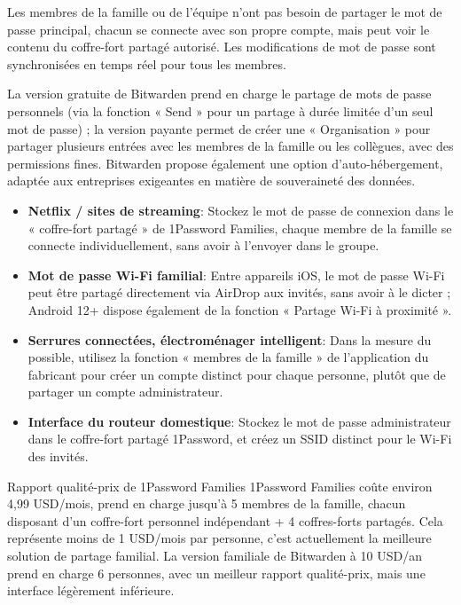 Les membres de la famille ou de l'équipe n'ont pas besoin de partager le mot de passe principal, chacun se connecte avec son propre compte, mais peut voir le contenu du coffre-fort partagé autorisé. Les modifications de mot de passe sont synchronisées en temps réel pour tous les membres.


La version gratuite de Bitwarden prend en charge le partage de mots de passe personnels (via la fonction « Send » pour un partage à durée limitée d'un seul mot de passe) ; la version payante permet de créer une « Organisation » pour partager plusieurs entrées avec les membres de la famille ou les collègues, avec des permissions fines. Bitwarden propose également une option d'auto-hébergement, adaptée aux entreprises exigeantes en matière de souveraineté des données.


\begin{itemize}
  \item \textbf{Netflix / sites de streaming}: Stockez le mot de passe de connexion dans le « coffre-fort partagé » de 1Password Families, chaque membre de la famille se connecte individuellement, sans avoir à l'envoyer dans le groupe.
  \item \textbf{Mot de passe Wi-Fi familial}: Entre appareils iOS, le mot de passe Wi-Fi peut être partagé directement via AirDrop aux invités, sans avoir à le dicter ; Android 12+ dispose également de la fonction « Partage Wi-Fi à proximité ».
  \item \textbf{Serrures connectées, électroménager intelligent}: Dans la mesure du possible, utilisez la fonction « membres de la famille » de l'application du fabricant pour créer un compte distinct pour chaque personne, plutôt que de partager un compte administrateur.
  \item \textbf{Interface du routeur domestique}: Stockez le mot de passe administrateur dans le coffre-fort partagé 1Password, et créez un SSID distinct pour le Wi-Fi des invités.
\end{itemize}

\begin{tcbinfo}{Rapport qualité-prix de 1Password Families}
1Password Families coûte environ 4,99 USD/mois, prend en charge jusqu'à 5 membres de la famille, chacun disposant d'un coffre-fort personnel indépendant + 4 coffres-forts partagés. Cela représente moins de 1 USD/mois par personne, c'est actuellement la meilleure solution de partage familial. La version familiale de Bitwarden à 10 USD/an prend en charge 6 personnes, avec un meilleur rapport qualité-prix, mais une interface légèrement inférieure.

\end{tcbinfo}

